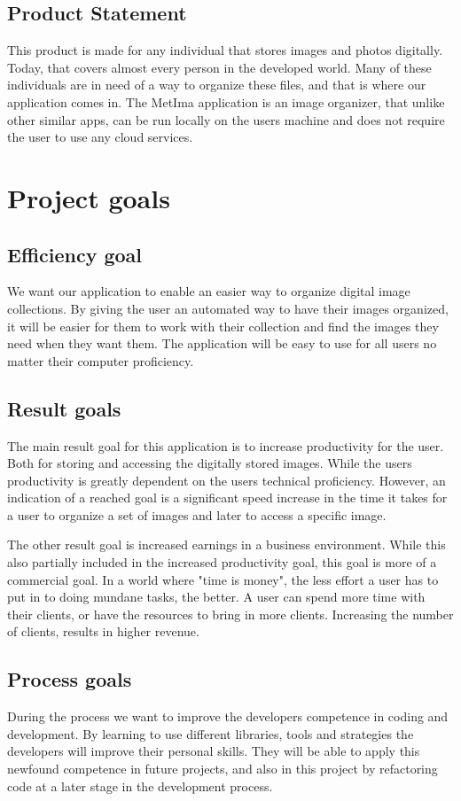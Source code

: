\documentclass{article}
\begin{document}
\subsection{Product Statement}
This product is made for any individual that stores images and photos digitally. Today, that covers almost every person in the developed world. Many of these individuals are in need of a way to organize these files, and that is where our application comes in. The MetIma application is an image organizer, that unlike other similar apps, can be run locally on the users machine and does not require the user to use any cloud services.

\section{Project goals}

\subsection{Efficiency goal}
We want our application to enable an easier way to organize digital image collections. By giving the user an automated way to have their images organized, it will be easier for them to work with their collection and find the images they need when they want them. The application will be easy to use for all users no matter their computer proficiency.

\subsection{Result goals}
The main result goal for this application is to increase productivity for the user. Both for storing and accessing the digitally stored images. While the users productivity is greatly dependent on the users technical proficiency. However, an indication of a reached goal is a significant speed increase in the time it takes for a user to organize a set of images and later to access a specific image.

The other result goal is increased earnings in a business environment. While this also partially included in the increased productivity goal, this goal is more of a commercial goal. In a world where "time is money", the less effort a user has to put in to doing mundane tasks, the better. A user can spend more time with their clients, or have the resources to bring in more clients. Increasing the number of clients, results in higher revenue.

\subsection{Process goals}
During the process we want to improve the developers competence in coding and development. By learning to use different libraries, tools and strategies the developers will improve their personal skills. They will be able to apply this newfound competence in future projects, and also in this project by refactoring code at a later stage in the development process. 
\end{document}
